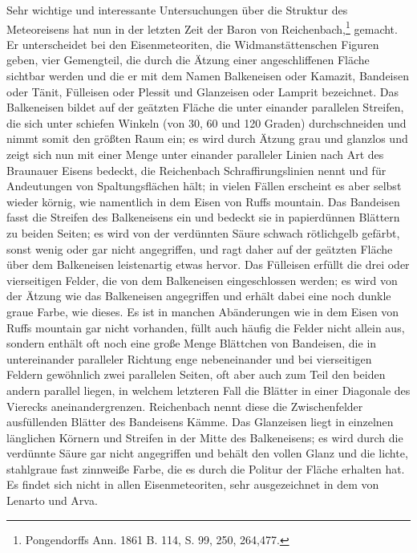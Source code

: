\documentclass[a4paper, 11pt, oneside]{article}
\begin{document}
Sehr wichtige und interessante Untersuchungen über die Struktur des Meteoreisens hat nun in der letzten Zeit der Baron von Reichenbach,\footnote{Pongendorffs Ann. 1861 B. 114, S. 99, 250, 264,477.} gemacht. Er unterscheidet bei den Eisenmeteoriten, die Widmanstättenschen Figuren geben, vier Gemengteil, die durch die Ätzung einer angeschliffenen Fläche sichtbar werden und die er mit dem Namen Balkeneisen oder Kamazit, Bandeisen oder Tänit, Fülleisen oder Plessit und Glanzeisen oder Lamprit bezeichnet. Das Balkeneisen bildet auf der geätzten Fläche die unter einander parallelen Streifen, die sich unter schiefen Winkeln (von 30, 60 und 120 Graden) durchschneiden und nimmt somit den größten Raum ein; es wird durch Ätzung grau und glanzlos und zeigt sich nun mit einer Menge unter einander paralleler Linien nach Art des Braunauer Eisens bedeckt, die Reichenbach Schraffirungslinien nennt und für Andeutungen von Spaltungsflächen hält; in vielen Fällen erscheint es aber selbst wieder körnig, wie namentlich in dem Eisen von Ruffs mountain. Das Bandeisen fasst die Streifen des Balkeneisens ein und bedeckt sie in papierdünnen Blättern zu beiden Seiten; es wird von der verdünnten Säure schwach rötlichgelb gefärbt, sonst wenig oder gar nicht angegriffen, und ragt daher auf der geätzten Fläche über dem Balkeneisen leistenartig etwas hervor. Das Fülleisen erfüllt die drei oder vierseitigen Felder, die von dem Balkeneisen eingeschlossen werden; es wird von der Ätzung wie das Balkeneisen angegriffen und erhält dabei eine noch dunkle graue Farbe, wie dieses. Es ist in manchen Abänderungen wie in dem Eisen von Ruffs mountain gar nicht vorhanden, füllt auch häufig die Felder nicht allein aus, sondern enthält oft noch eine große Menge Blättchen von Bandeisen, die in untereinander paralleler Richtung enge nebeneinander und bei vierseitigen Feldern gewöhnlich zwei parallelen Seiten, oft aber auch zum Teil den beiden andern parallel liegen, in welchem letzteren Fall die Blätter in einer Diagonale des Vierecks aneinandergrenzen. Reichenbach nennt diese die Zwischenfelder ausfüllenden Blätter des Bandeisens Kämme. Das Glanzeisen liegt in einzelnen länglichen Körnern und Streifen in der Mitte des Balkeneisens; es wird durch die verdünnte Säure gar nicht angegriffen und behält den vollen Glanz und die lichte, stahlgraue fast zinnweiße Farbe, die es durch die Politur der Fläche erhalten hat. Es findet sich nicht in allen Eisenmeteoriten, sehr ausgezeichnet in dem von Lenarto und Arva.
\end{document}
